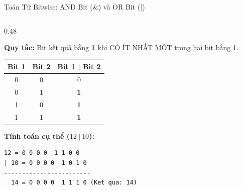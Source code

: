 \documentclass[aspectratio=169, 10pt]{beamer}
\begin{document}
\begin{frame}[fragile]{Toán Tử Bitwise: AND Bit (\&) và OR Bit (|)}
\begin{columns}[T]
    \begin{column}{0.48\textwidth}
      \begin{tcolorbox}[colback=CSharpPurple!5,colframe=CSharpPurple,title=\textbf{Phép OR Bit (|): Bật / Gộp Bit},fonttitle=\small\bfseries]
        \textbf{Quy tắc:} Bit kết quả bằng \textbf{1} khi CÓ ÍT NHẤT MỘT trong hai bit bằng 1.
        \begin{table}[h]
          \centering
          \scriptsize
          \begin{tabular}{c c c}
            \toprule
            \textbf{Bit 1} & \textbf{Bit 2} & \textbf{Bit 1 | Bit 2} \\
            \midrule
            0 & 0 & 0 \\
            0 & 1 & \textbf{1} \\
            1 & 0 & \textbf{1} \\
            1 & 1 & \textbf{1} \\
            \bottomrule
          \end{tabular}
        \end{table}
        \textbf{Tính toán cụ thể ($12 \ | \ 10$):}
\begin{lstlisting}[numbers=none]
  12 = 0 0 0 0  1 1 0 0
| 10 = 0 0 0 0  1 0 1 0
------------------------
  14 = 0 0 0 0  1 1 1 0 (Ket qua: 14)
\end{lstlisting}
      \end{tcolorbox}
    \end{column}
  \end{columns}
\end{frame}
\end{document}
